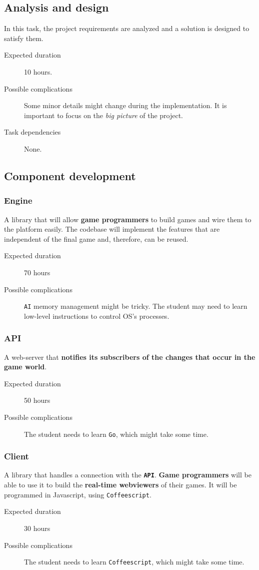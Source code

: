 \documentclass[a4paper,11pt,titlepage,abstract,numbers=noenddot,automark,mnsy,intlimits,rgb,dvipsnames]{report}
\begin{document}
\subsection{Analysis and design}
In this task, the project requirements are analyzed and a solution is designed to satisfy them.
\begin{description}
\item[Expected duration]
10 hours.
\item[Possible complications]
Some minor details might change during the implementation. It is
  important to focus on the \emph{big picture} of the project.
\item[Task dependencies]
None.
\end{description}
\subsection{Component development}
\subsubsection{Engine}
A library that will allow \textbf{game programmers} to build games and wire them to the platform
easily. The codebase will implement the features that are independent of the final game and, therefore, can be reused.
\begin{description}
\item[Expected duration]
70 hours
\item[Possible complications]
\texttt{AI} memory management might be tricky.
  The student may need to learn low-level instructions to control OS's processes.
\end{description}
\subsubsection{API}
A web-server that \textbf{notifies its subscribers of the changes that occur in the game world}.
\begin{description}
\item[Expected duration]
50 hours
\item[Possible complications]
The student needs to learn \texttt{Go}, which might take some time.
\end{description}
\subsubsection{Client}
A library that handles a connection with the \textbf{\texttt{API}}. \textbf{Game programmers} will be able to use it to build
the \textbf{real-time webviewers} of their games. It will be programmed in \texttt{}Javascript\texttt{}, using \texttt{Coffeescript}.
\begin{description}
\item[Expected duration]
30 hours
\item[Possible complications]
The student needs to learn \texttt{Coffeescript}, which might take some time.
\end{description}
\end{document}
